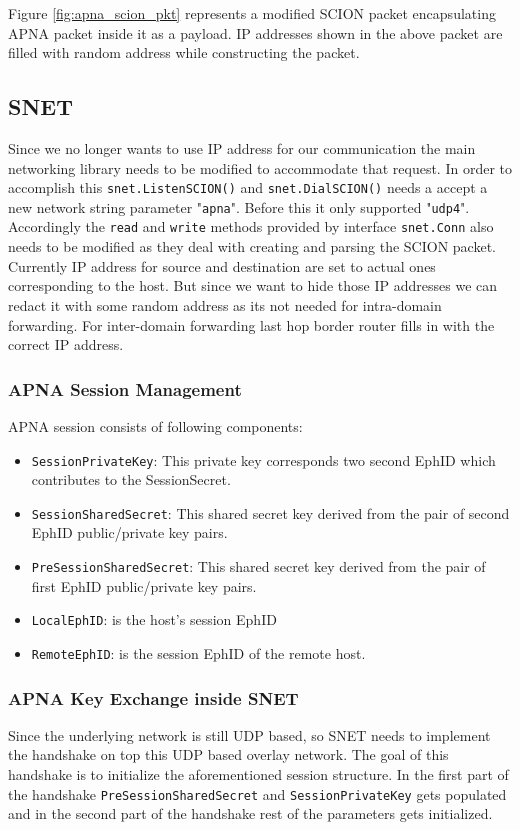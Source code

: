 Figure \ref{fig:apna_scion_pkt} represents a modified SCION packet encapsulating APNA packet inside it as a payload. IP addresses shown in the above packet are filled with random address while constructing the packet.

\subsection{SNET}
Since we no longer wants to use IP address for our communication the main networking library needs to be modified to accommodate that request. In order to accomplish this \texttt{snet.ListenSCION()} and \texttt{snet.DialSCION()} needs a accept a new network string parameter "\texttt{apna}". Before this it only supported "\texttt{udp4}". Accordingly the \texttt{read} and \texttt{write} methods provided by interface \texttt{snet.Conn} also needs to be modified as they deal with creating and parsing the SCION packet. Currently IP address for source and destination are set to actual ones corresponding to the host. But since we want to hide those IP addresses we can redact it with some random address as its not needed for intra-domain forwarding. For inter-domain forwarding last hop border router fills in with the correct IP address.

\subsubsection{APNA Session Management}
APNA session consists of following components:
\begin{itemize}
    \item \texttt{SessionPrivateKey}:  This private key corresponds two second EphID which contributes to the SessionSecret.
    \item \texttt{SessionSharedSecret}: This shared secret key derived from the pair of second EphID public/private key pairs.
    \item \texttt{PreSessionSharedSecret}: This shared secret key derived from the pair of first EphID public/private key pairs.
    \item \texttt{LocalEphID}: is the host's session EphID
    \item \texttt{RemoteEphID}: is the session EphID of the remote host.
\end{itemize}

\subsubsection{APNA Key Exchange inside SNET}
Since the underlying network is still UDP based, so SNET needs to implement the handshake on top this UDP based overlay network. The goal of this handshake is to initialize the aforementioned session structure. In the first part of the handshake \texttt{PreSessionSharedSecret} and  \texttt{SessionPrivateKey} gets populated and in the second part of the handshake rest of the parameters gets initialized.

